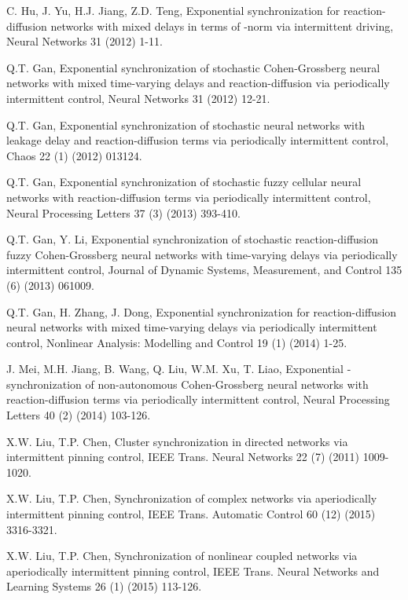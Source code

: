 \documentclass[review]{elsarticle}
\begin{document}
\begin{thebibliography}{99}
C. Hu, J. Yu, H.J. Jiang, Z.D. Teng, Exponential synchronization for reaction-diffusion networks with mixed delays in terms of -norm via intermittent driving, Neural Networks 31 (2012) 1-11.

Q.T. Gan, Exponential synchronization of stochastic Cohen-Grossberg neural networks with mixed time-varying delays and reaction-diffusion via periodically intermittent control, Neural Networks 31 (2012) 12-21.

Q.T. Gan, Exponential synchronization of stochastic neural networks with leakage delay and reaction-diffusion terms via periodically intermittent control, Chaos 22 (1) (2012) 013124.

Q.T. Gan, Exponential synchronization of stochastic fuzzy cellular neural networks with reaction-diffusion terms via periodically intermittent control, Neural Processing Letters 37 (3) (2013) 393-410.

Q.T. Gan, Y. Li, Exponential synchronization of stochastic reaction-diffusion fuzzy Cohen-Grossberg neural networks with time-varying delays via periodically intermittent control, Journal of Dynamic Systems, Measurement, and Control 135 (6) (2013) 061009.

Q.T. Gan, H. Zhang, J. Dong, Exponential synchronization for reaction-diffusion neural networks with mixed time-varying delays via periodically intermittent control, Nonlinear Analysis: Modelling and Control 19 (1) (2014) 1-25.

J. Mei, M.H. Jiang, B. Wang, Q. Liu, W.M. Xu, T. Liao, Exponential -synchronization of non-autonomous Cohen-Grossberg neural networks with reaction-diffusion terms via periodically intermittent control, Neural Processing Letters 40 (2) (2014) 103-126.






X.W. Liu, T.P. Chen, Cluster synchronization in directed networks via intermittent pinning control, IEEE Trans. Neural Networks 22 (7) (2011) 1009-1020.

X.W. Liu, T.P. Chen, Synchronization of complex networks via aperiodically intermittent pinning control, IEEE Trans. Automatic Control 60 (12) (2015) 3316-3321.

X.W. Liu, T.P. Chen, Synchronization of nonlinear coupled networks via aperiodically intermittent pinning control, IEEE Trans. Neural Networks and Learning Systems 26 (1) (2015) 113-126.


\end{thebibliography}
\end{document}
